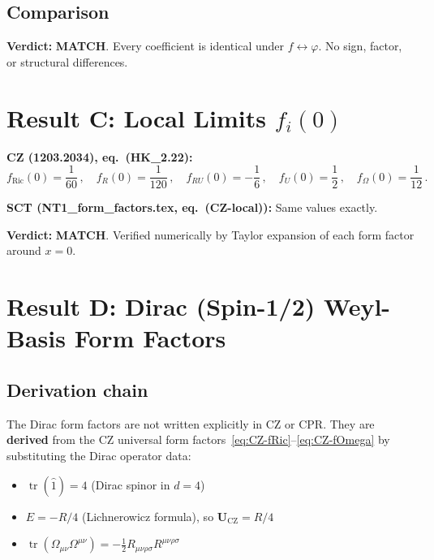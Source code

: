 \documentclass[12pt,a4paper]{article}
\theoremstyle{definition}
\theoremstyle{remark}
\newcommand{\tr}{\operatorname{tr}}
\newcommand{\Rsq}{R_{\mu\nu\rho\sigma}R^{\mu\nu\rho\sigma}}
\newcommand{\match}{\textcolor{green!60!black}{\textbf{MATCH}}}
\begin{document}
\subsection{Comparison}

\textbf{Verdict:} \match.
Every coefficient is identical under $f \leftrightarrow \varphi$.
No sign, factor, or structural differences.


\section{Result C: Local Limits $f_i(0)$}
\label{sec:local}

\noindent\textbf{CZ (1203.2034), eq.~(HK\_2.22):}
\begin{equation}
  f_{\text{Ric}}(0) = \frac{1}{60}\,,\quad
  f_R(0) = \frac{1}{120}\,,\quad
  f_{RU}(0) = -\frac{1}{6}\,,\quad
  f_U(0) = \frac{1}{2}\,,\quad
  f_\Omega(0) = \frac{1}{12}\,.
\end{equation}

\noindent\textbf{SCT (NT1\_form\_factors.tex, eq.~(CZ-local)):}
Same values exactly.

\textbf{Verdict:} \match.  Verified numerically by Taylor expansion of each
form factor around $x = 0$.


\section{Result D: Dirac (Spin-1/2) Weyl-Basis Form Factors}
\label{sec:dirac}

\subsection{Derivation chain}

The Dirac form factors are not written explicitly in CZ or CPR.
They are \textbf{derived} from the CZ universal form
factors~\eqref{eq:CZ-fRic}--\eqref{eq:CZ-fOmega}
by substituting the Dirac operator data:
\begin{itemize}[nosep]
\item $\tr(\hat{1}) = 4$ (Dirac spinor in $d=4$)
\item $E = -R/4$ (Lichnerowicz formula), so $\mathbf{U}_{\text{CZ}} = R/4$
\item $\tr(\Omega_{\mu\nu}\Omega^{\mu\nu}) = -\frac{1}{2}\Rsq$
\end{itemize}
\end{document}

